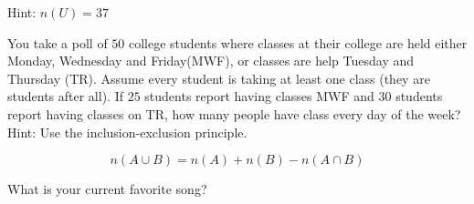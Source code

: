 \documentclass[addpoints,12pt]{exam}
\begin{document}
\begin{questions}
\begin{enumerate}[label = \alph*)]
			Hint: $n(U) = 37$
\end{enumerate}

\begin{center}
\end{center}


\newpage
\question You take a poll of $50 $ college students where classes at their college are held either Monday, Wednesday and Friday(MWF), or classes are help Tuesday and Thursday (TR). Assume every student is taking at least one class (they are students after all). If $25$ students report having classes MWF and $30$ students report having classes on TR, how many people have class every day of the week? Hint: Use the inclusion-exclusion principle. 


\begin{theorem}
		\[
		n(A\cup B) = n(A)+n(B)-n(A\cap B)
		\]
\end{theorem}\vfill 

\question  What is your current favorite song? \vfill


\end{questions}
\end{document}
